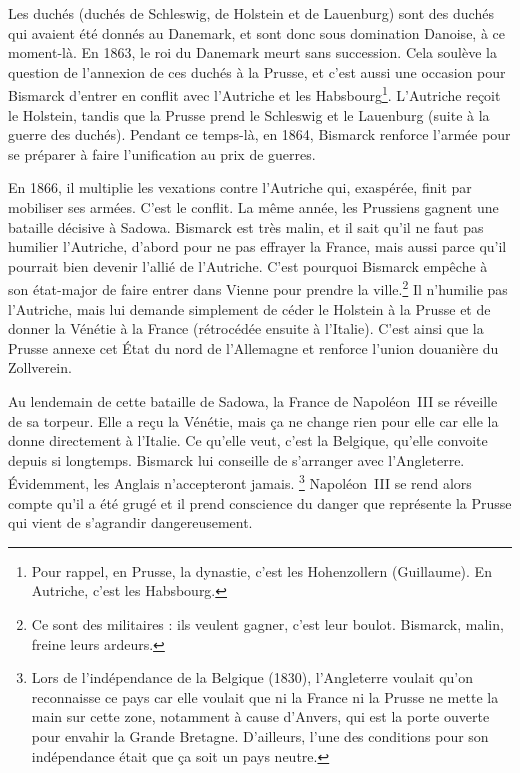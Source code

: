 \documentclass[12pt]{report}
\begin{document}

Les duchés (duchés de Schleswig, de Holstein et de Lauenburg) sont des duchés qui avaient été donnés au Danemark, et sont donc sous domination Danoise, à ce moment-là.
En 1863, le roi du Danemark meurt sans succession.
Cela soulève la question de l'annexion de ces duchés à la Prusse, et c'est aussi une occasion pour Bismarck d'entrer en conflit avec l'Autriche et les Habsbourg\footnote{Pour rappel, en Prusse, la dynastie, c'est les Hohenzollern (Guillaume). En Autriche, c'est les Habsbourg.}.
L'Autriche reçoit le Holstein, tandis que la Prusse prend le Schleswig et le Lauenburg (suite à la guerre des duchés).
Pendant ce temps-là, en 1864, Bismarck renforce l'armée pour se préparer à faire l'unification au prix de guerres.

En 1866, il multiplie les vexations contre l'Autriche qui, exaspérée, finit par mobiliser ses armées.
C'est le conflit.
La même année, les Prussiens gagnent une bataille décisive à Sadowa.
Bismarck est très malin, et il sait qu'il ne faut pas humilier l'Autriche, d'abord pour ne pas effrayer la France, mais aussi parce qu'il pourrait bien devenir l'allié de l'Autriche.
C'est pourquoi Bismarck empêche à son état-major de faire entrer dans Vienne pour prendre la ville.\footnote{Ce sont des militaires : ils veulent gagner, c'est leur boulot. Bismarck, malin, freine leurs ardeurs.}
Il n'humilie pas l'Autriche, mais lui demande simplement de céder le Holstein à la Prusse et de donner la Vénétie à la France (rétrocédée ensuite à l'Italie).
C'est ainsi que la Prusse annexe cet État du nord de l'Allemagne et renforce l'union douanière du Zollverein.


Au lendemain de cette bataille de Sadowa, la France de Napoléon~III se réveille de sa torpeur.
Elle a reçu la Vénétie, mais ça ne change rien pour elle car elle la donne directement à l'Italie.
Ce qu'elle veut, c'est la Belgique, qu'elle convoite depuis si longtemps.
Bismarck lui conseille de s'arranger avec l'Angleterre.
Évidemment, les Anglais n'accepteront jamais.
\footnote{Lors de l'indépendance de la Belgique (1830), l'Angleterre voulait qu'on reconnaisse ce pays car elle voulait que ni la France ni la Prusse ne mette la main sur cette zone, notamment à cause d'Anvers, qui est la porte ouverte pour envahir la Grande Bretagne. D'ailleurs, l'une des conditions pour son indépendance était que ça soit un pays neutre.}
Napoléon~III se rend alors compte qu’il a été grugé et il prend conscience du danger que représente la Prusse qui vient de s'agrandir dangereusement.
\end{document}
